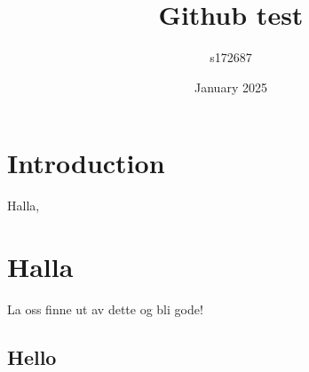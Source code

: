 \documentclass{article}
\title{Github test}
\author{s172687 }
\date{January 2025}
\begin{document}
\maketitle

\section{Introduction}
Halla, 
\section{Halla}
La oss finne ut av dette og bli gode!

\subsection{Hello}
\end{document}
